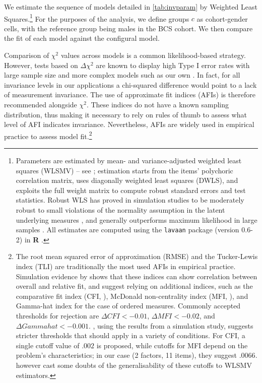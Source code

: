 We estimate the sequence of models detailed in \autoref{tab:invparam} by Weighted Least Squares.\footnote{Parameters are estimated by mean- and variance-adjusted weighted least squares (WLSMV) -- see \citet{Muthen1997}; estimation starts from the items' polychoric correlation matrix, uses diagonally weighted least squares (DWLS), and exploits the full weight matrix to compute robust standard errors and test statistics. Robust WLS has proved in simulation studies to be moderately robust to small violations of the normality assumption in the latent underlying measures \citep{Flora2004}, and generally outperforms maximum likelihood in large samples \citep{Beauducel2006,Li2016}. All estimates are computed using the \texttt{lavaan} package (version 0.6-2) in \textbf{\textsf{R}} \citep{Rosseel2012}.}
For the purposes of the analysis, we define groups $c$ as cohort-gender cells, with the reference group being males in the BCS cohort. We then compare the fit of each model against the configural model.

Comparison of $\chi^2$ values across models is a common likelihood-based strategy. However, tests based on $\Delta \chi^2$ are known to display high Type I error rates with large sample size and more complex models such as our own \citep{Sass2014}. In fact, for all invariance levels in our applications a chi-squared difference would point to a lack of measurement invariance. The use of approximate fit indices (AFIs) is therefore recommended alongside $\chi^2$. These indices do not have a known sampling distribution, thus making it necessary to rely on rules of thumb to assess what level of \textDelta AFI indicates invariance. Nevertheless, AFIs are widely used in empirical practice to assess model fit.\footnote{The root mean squared error of approximation (RMSE) and the Tucker-Lewis index (TLI) are traditionally the most used AFIs in empirical practice. Simulation evidence by \cite{Cheung2002} shows that these indices can show correlation between overall and relative fit, and suggest relying on additional indices, such as the comparative fit index (CFI, \citealp{Bentler1990}), McDonald non-centrality index (MFI, \citealp{McDonald1989}), and Gamma-hat index \citep{Steiger1989} for the case of ordered measures. Commonly accepted thresholds for rejection are $\Delta CFI < - 0.01$, $\Delta MFI < - 0.02$, and $\Delta Gamma hat < - 0.001$. \cite{Meade2008}, using the results from a simulation study, suggests stricter thresholds that should apply in a variety of conditions. For CFI, a single cutoff value of $.002$ is proposed, while cutoffs for MFI depend on the problem's characteristics; in our case (2 factors, 11 items), they suggest $.0066$. \cite{Sass2014} however cast some doubts of the generalisability of these cutoffs to WLSMV estimators.}

